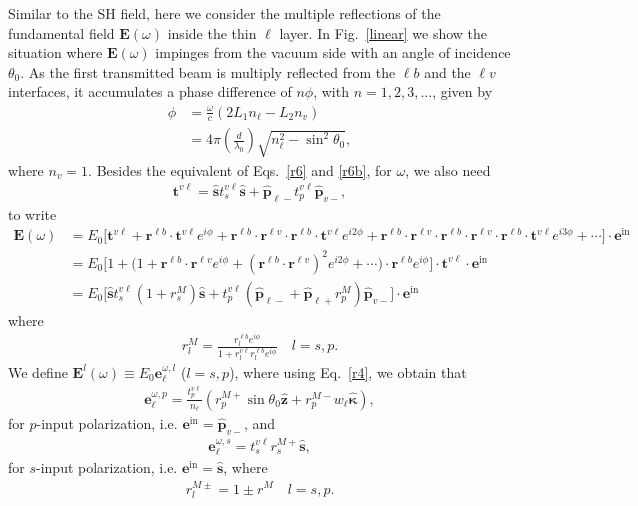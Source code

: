 Similar to the SH field, here we consider the multiple reflections of
the fundamental field $\mathbf{E}(\omega)$ inside the thin $\ell$ layer.
In Fig.~\ref{linear} we show the situation where $\mathbf{E}(\omega)$
impinges from the vacuum side with an angle of incidence $\theta_{0}$. 
As the first transmitted beam is multiply reflected from the $\ell b$ and the
$\ell v$ interfaces, it accumulates a phase difference of $n\phi$,
with $n=1,2,3,\ldots$, given by
\begin{align}\label{mphi}
\phi&=\frac{\omega}{c}(2L_1n_\ell-L_2n_v)
\nonumber\\
&=4\pi\left(\frac{d}{\lambda_0}\right)\sqrt{n^2_\ell-\sin^2\theta_{0}}
,
\end{align}
where $n_v=1$. Besides the equivalent of Eqs.~\eqref{r6} and
\eqref{r6b}, for $\omega$, we also need
\begin{align}\label{mvv}
\mathbf{t}^{v\ell}
= \hat{\mathbf{s}}t_s^{v\ell}\hat{\mathbf{s}} 
+ \hat{\mathbf{p}}_{\ell -}t_{p}^{v\ell} \hat{\mathbf{p}}_{v -}
,
\end{align}
to write
\begin{align}\label{mcvew}
\mathbf{E}(\omega)
&=E_{0}\Big[
\mathbf{t}^{v\ell}
+
\mathbf{r}^{\ell b}\cdot\mathbf{t}^{v\ell}e^{i\phi}
+
\mathbf{r}^{\ell b}\cdot\mathbf{r}^{\ell v}\cdot \mathbf{r}^{\ell b}\cdot\mathbf{t}^{v\ell} e^{i2\phi}
+
\mathbf{r}^{\ell b}\cdot\mathbf{r}^{\ell v}\cdot 
\mathbf{r}^{\ell b}\cdot\mathbf{r}^{\ell v}
\cdot \mathbf{r}^{\ell b}\cdot\mathbf{t}^{v\ell} e^{i3\phi}
+\cdots\Big]\cdot\mathbf{e}^{\mathrm{in}}
\nonumber\\
&=E_{0}\Big[
1
+
\Big(1+
\mathbf{r}^{\ell b}\cdot\mathbf{r}^{\ell v}e^{i\phi}
+
(\mathbf{r}^{\ell b}\cdot\mathbf{r}^{\ell v})^2e^{i2\phi}+\cdots
\Big)\cdot
\mathbf{r}^{\ell b}e^{i\phi}
\Big]\cdot \mathbf{t}^{v\ell}\cdot\mathbf{e}^{\mathrm{in}}
\nonumber\\
&=
E_{0}\Big[\hat{\mathbf{s}} t^{v\ell}_s(1+r^M_s)\hat{\mathbf{s}}
+
t^{v\ell}_p\left(\hat{\mathbf{p}}_{\ell-}+\hat{\mathbf{p}}_{\ell+}r^{M}_p
\right)\hat{\mathbf{p}}_{v-}
\Big]\cdot\mathbf{e}^{\mathrm{in}}
\end{align}
where
\begin{align}\label{mvrm}
r^M_l=\frac{r^{\ell b}_le^{i\phi}}{1+r^{v\ell}_lr^{\ell
  b}_le^{i\phi}}\quad l=s,p
.
\end{align}
We define $\mathbf{E}^{l}(\omega)\equiv E_{0}\mathbf{e}^{\omega,l}_\ell$ ($l=s,p$),
where using Eq.~\eqref{r4}, we obtain that
\begin{eqnarray}\label{mcvep}
\mathbf{e}^{\omega,p}_{\ell}=\frac{t^{v\ell}_p}{n_\ell}
\left( 
r^{M+}_p\sin\theta_{0}\hat{\mathbf{z}}
+ 
r^{M-}_pw_\ell\hat{\boldsymbol{\kappa}}
\right)  
,
\end{eqnarray} 
for $p$-input polarization, i.e. $\mathbf{e}^{\mathrm{in}}=\hat{\mathbf{p}}_{v-}$, 
and
\begin{eqnarray}\label{mcvep}
\mathbf{e}^{\omega,s}_\ell=t^{v\ell}_sr^{M+}_s\hat{\mathbf{s}}
,
\end{eqnarray}
for $s$-input polarization, i.e. $\mathbf{e}^{\mathrm{in}}=\hat{\mathbf{s}}$,
where
\begin{eqnarray}\label{mvc}
r^{M\pm}_l=1\pm r^M \quad l=s,p.
\end{eqnarray}

